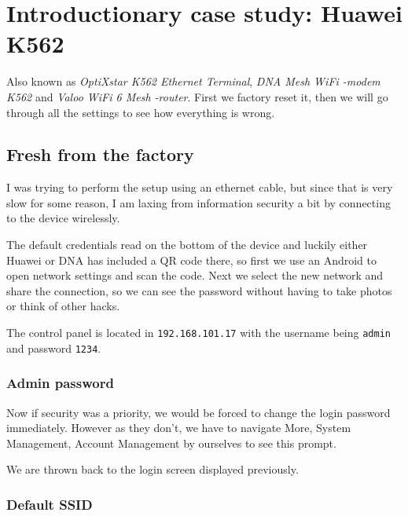 \documentclass[../wifi-security.tex]{subfiles}
\begin{document}
\chapter{Introductionary case study: Huawei K562}

Also known as \textit{OptiXstar K562 Ethernet Terminal}, \textit{DNA Mesh WiFi -modem K562} and \textit{Valoo WiFi 6 Mesh -router}. First we factory reset it, then we will go through all the settings to see how everything is wrong.

\section{Fresh from the factory}

I was trying to perform the setup using an ethernet cable, but since that is very slow for some reason, I am laxing from information security a bit by connecting to the device wirelessly.


The default credentials read on the bottom of the device and luckily either Huawei or DNA has included a QR code there, so first we use an Android to open network settings and scan the code. Next we select the new network and share the connection, so we can see the password without having to take photos or think of other hacks.

The control panel is located in \texttt{192.168.101.17} with the username being \texttt{admin} and password \texttt{1234}.


\subsection{Admin password}

Now if security was a priority, we would be forced to change the login password immediately. However as they don't, we have to navigate More, System Management, Account Management by ourselves to see this prompt.


We are thrown back to the login screen displayed previously.


\subsection{Default SSID}
\end{document}
